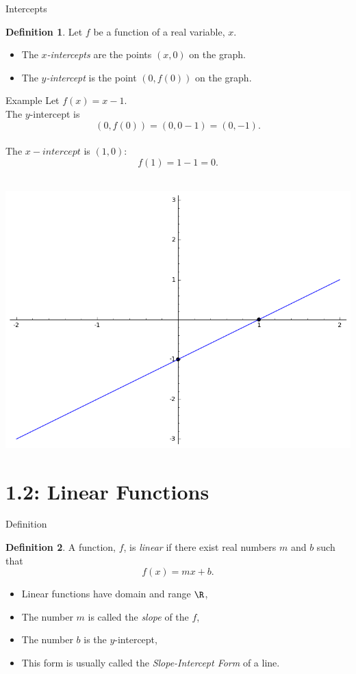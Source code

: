 \documentclass{beamer}
\theoremstyle{definition}
\newtheorem{defn}{Definition}
\begin{document}
\begin{frame}{Intercepts}
  \begin{defn}
    Let $f$ be a function of a real variable, $x$.
    \begin{itemize}
      \item<2->
        The {\it $x$-intercepts} are the points $(x,0)$ on the graph.
      \item<3->
        The {\it $y$-intercept} is the point $(0,f(0))$ on the graph.
    \end{itemize}
  \end{defn}
\end{frame}

\begin{frame}{Example}
  Let $f(x) = x - 1$.\\
  \pause
  The $y$-intercept is
  $$(0,f(0)) = (0, 0 - 1) = (0,-1).$$\\
  \pause
  The $x-intercept$ is $(1,0)$:
  $$f(1) = 1 - 1 = 0.$$\\
  \pause
  \begin{center}
    \includegraphics[scale=0.25]{imgs/intercepts}
  \end{center}
\end{frame}

\section{1.2: Linear Functions}

\begin{frame}{Definition}
  \begin{defn}
    A function, $f$, is {\it linear} if there exist real numbers $m$ and $b$ such that
    $$f(x) = mx + b.$$
    \begin{itemize}
    \item<2->
      Linear functions have domain and range $\R$,
    \item<3->
      The number $m$ is called the {\it slope} of the $f$,
    \item<4->
      The number $b$ is the $y$-intercept,
    \item<5->
      This form is usually called the {\it Slope-Intercept Form} of a line.
    \end{itemize}
  \end{defn}
\end{frame}
\end{document}
